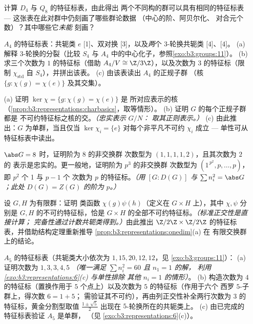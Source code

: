 \begin{exercise}[$\star\star$]\label{exo:b3:representations:4}
计算 $D_4$ 与 $Q_8$ 的特征标表，由此得出
两个不同构的群可以具有相同的特征标表 ---
这张表在此对群中仍刻画了哪些群论数据
（中心的阶、阿贝尔化、
对合元个数）？其中哪些它\emph{未能}
刻画？
\end{exercise}

\begin{exercise}[$\star\star$]\label{exo:b3:representations:5}
$A_4$ 的特征标表：共轭类 $e$ [1]、双对换
[3]，以及\emph{两}个 $3$-轮换共轭类 [4]、[4]。
(a) 解释 $3$-轮换的分裂（比较
$S_4$ 与 $A_4$ 中的中心化子，参照\cref{exo:b3:groups:11}）。
(b) 求三个次数为 $1$ 的特征标（借助 $A_4/V \cong
\Z/3\Z$），以及次数为 $3$ 的特征标（限制
$\chi_{\mathrm{std}}$ 自 $S_4$），并拼出该表。
(c) 由该表读出 $A_4$ 的正规子群
（核 $\{g : \chi(g) = \chi(e)\}$ 及其交集）。
\end{exercise}

\begin{exercise}[$\star\star$]\label{exo:b3:representations:6}
(a) 证明 $\ker\chi = \{g : \chi(g) = \chi(e)\}$ 是
所对应表示的核
（\cref{prop:b3:representations:charbasics}，取等情形）。
(b) 证明 $G$ 的每个正规子群都是
不可约特征标之核的交。\emph{（忠实表示 $G/N$：
取其正则表示。）}
(c) 由此推出：$G$ 为单群，当且仅当 $\ker\chi_i = \{e\}$
对每个非平凡不可约 $\chi_i$ 成立 --- 单性可从
特征标表中读出。
\end{exercise}

\begin{exercise}[$\star\star$]\label{exo:b3:representations:7}
$\abs G = 8$ 时，证明阶为 $8$ 的非交换群
次数型为 $(1,1,1,1,2)$，且其次数为 $2$ 的
表示是忠实的。更一般地，证明阶为 $p^3$ 的非交换群
次数型为 $(1^{\,p^2},
p, \dots, p)$，即 $p^2$ 个 1 与 $p - 1$ 个
次数为 $p$ 的特征标。\emph{（用 $[G : D(G)]$ 与 $\sum n_i^2 = \abs G$；此处
$D(G) = Z(G)$ 的阶为 $p$。）}
\end{exercise}

\begin{exercise}[$\star\star\star$]\label{exo:b3:representations:8}
设 $G, H$ 为有限群：证明
类函数 $\chi(g)\psi(h)$（定义在 $G \times H$ 上），其中 $\chi, \psi$
分别是 $G, H$ 的不可约特征标，恰是
$G \times H$ 的全部不可约特征标。\emph{（标准正交性是直接计算；
完备性通过计数共轭类得到。）}由此推出
$\Z/2\Z \times \Z/2\Z$ 的特征标表，并借助结构定理重新推导
\cref{prop:b3:representations:onedim}(a) 在
有限交换群上的结论。
\end{exercise}

\begin{exercise}[$\star\star\star$]\label{exo:b3:representations:9}
$A_5$ 的特征标表（共轭类大小依次为 $1, 15, 20, 12,
12$，见 \cref{exo:b3:groups:11}）：
(a) 证明次数为 $1, 3, 3, 4, 5$ \emph{（唯一满足 $\sum n_i^2 = 60$
且 $n_1 = 1$ 的解，
利用 \cref{exo:b3:representations:6}(c) 与单性排除
其他 $n_i = 1$ 的情形）}。
(b) 构造次数为 $4$ 的特征标（置换作用于
$5$ 个点上）以及次数为 $5$ 的特征标（作用于六个
西罗 $5$-子群上，得次数 $6 = 1 + 5$；
需验证其不可约），再由列正交性补全两行次数为 $3$ 的
特征标，黄金分割型取值 $\frac{1\pm\sqrt5}2$ 出现在
$5$-轮换所在的共轭类上。
(c) 由已完成的特征标表验证 $A_5$ 是单群，
（见 \cref{exo:b3:representations:6}(c)）。
\end{exercise}


